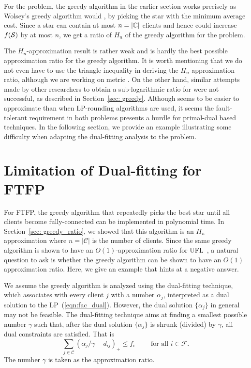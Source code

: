 \documentclass[oneside,final]{ucr}
\begin{document}
For the {\FTFP} problem, the greedy algorithm in the earlier
section works precisely as Wolsey's greedy algorithm would ,
by picking the star with the minimum average cost. Since a
star can contain at most $n=|\mathbb{C}|$ clients and hence
could increase $f(\calS)$ by at most $n$, we get a ratio of
$H_n$ of the greedy algorithm for the {\FTFP} problem.

The $H_n$-approximation result is rather weak and is hardly
the best possible approximation ratio for the greedy
algorithm. It is worth mentioning that we do not even have
to use the triangle inequality in deriving the $H_n$
approximation ratio, although we are working on metric
{\FTFP}. On the other hand, similar attempts made by other
researchers to obtain a sub-logarithmic ratio for {\FTFL}
were not successful, as described in Section~\ref{sec:
  greedy}. Although {\FTFP} seems to be easier to
approximate than {\FTFL} when LP-rounding algorithms are
used, it seems the fault-tolerant requirement in both
problems presents a hurdle for primal-dual based
techniques. In the following section, we provide an example
illustrating some difficulty when adapting the dual-fitting
analysis to the {\FTFP} problem.

\section{Limitation of Dual-fitting for FTFP}
\label{sec: greedy_example}
For FTFP, the greedy algorithm that repeatedly picks the
best star until all clients become fully-connected can be
implemented in polynomial time. In Section~\ref{sec:
  greedy_ratio}, we showed that this algorithm is an
$H_n$-approximation where $n=|\mathcal C|$ is the number of
clients. Since the same greedy algorithm is shown to have an
$O(1)$-approximation ratio for UFL~\cite{MahdianMSV01}, a
natural question to ask is whether the greedy algorithm can
be shown to have an $O(1)$ approximation ratio. Here, we
give an example that hints at a negative answer.

We assume the greedy algorithm is analyzed using the
dual-fitting technique, which associates with every client
$j$ with a number $\alpha_j$, interpreted as a dual solution
to the LP~(\ref{eqn:fac_dual}). However, the dual solution
$\{\alpha_j\}$ in general may not be feasible. The
dual-fitting technique aims at finding a smallest possible
number $\gamma$ such that, after the dual solution
$\{\alpha_j\}$ is shrunk (divided) by $\gamma$, all dual
constraints are satisfied. That is
\begin{equation*}
\sum_{j\in \mathcal C} (\alpha_j/\gamma
- d_{ij})_+ \leq f_i \qquad \text{ for all } i\in \mathcal F. 
\end{equation*}
The number $\gamma$ is taken as the approximation ratio.
\end{document}
